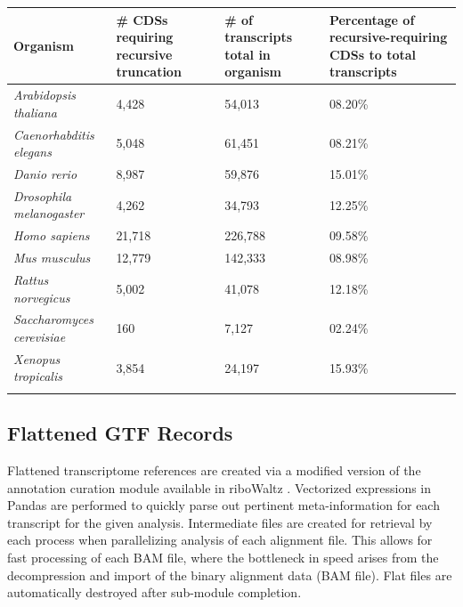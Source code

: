 \documentclass[10pt, oneside]{article}
\begin{document}
\begin{table}[!]
    \centering
{}
\begin{tabular}{p{6cm}p{3.3cm}p{3.3cm}p{3.3cm}}
 \textbf{Organism} & \textbf{\# CDSs requiring recursive truncation} & \textbf{\# of transcripts total in organism} & \textbf{Percentage of recursive-requiring CDSs to total transcripts} \\
 \hline
 \textit{Arabidopsis thaliana} & 4,428 & 54,013 & 08.20\% \\
 \hline
 \textit{Caenorhabditis elegans} & 5,048 & 61,451 & 08.21\% \\
 \hline
 \textit{Danio rerio} & 8,987 & 59,876 & 15.01\% \\
 \hline
 \textit{Drosophila melanogaster} & 4,262 & 34,793 & 12.25\% \\
 \hline
 \textit{Homo sapiens} & 21,718 & 226,788 & 09.58\% \\
 \hline
 \textit{Mus musculus} & 12,779 & 142,333 & 08.98\% \\
 \hline
 \textit{Rattus norvegicus} & 5,002 & 41,078 & 12.18\% \\
 \hline
 \textit{Saccharomyces cerevisiae} & 160 & 7,127 & 02.24\% \\
 \hline
 \textit{Xenopus tropicalis} & 3,854 & 24,197 & 15.93\% \\
 \label{tab:truncation}
\end{tabular}
\end{table}

\subsection*{Flattened GTF Records}
Flattened transcriptome references are created via a modified version of the annotation curation module available in riboWaltz \cite{ribowaltz}. Vectorized expressions in Pandas \cite{pandas} are performed to quickly parse out pertinent meta-information for each transcript for the given analysis. Intermediate files are created for retrieval by each process when parallelizing analysis of each alignment file. This allows for fast processing of each BAM file, where the bottleneck in speed arises from the decompression and import of the binary alignment data (BAM file). Flat files are automatically destroyed after sub-module completion. \\
\end{document}
